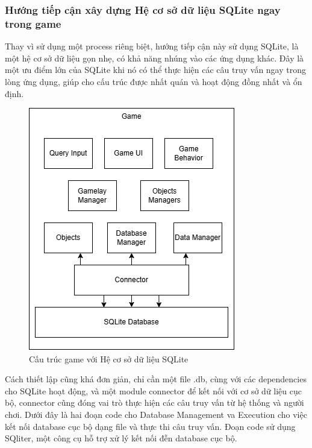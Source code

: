 \subsubsection{Hướng tiếp cận xây dựng Hệ cơ sở dữ liệu SQLite ngay trong game}
\hspace*{1cm} Thay vì sử dụng một process riêng biệt, hướng tiếp cận này sử dụng SQLite, là một hệ cơ sở dữ liệu gọn nhẹ, có khả năng nhúng vào các ứng dụng khác. Đây là một ưu điểm lớn của SQLite khi nó có thể thực hiện các câu truy vấn ngay trong lòng ứng dụng, giúp cho cấu trúc được nhất quán và hoạt động đồng nhất và ổn định.
\begin{figure}[H]
	\centering
	\includegraphics[width=\textwidth]{Images/SQLITE.png}
	\vspace{0.5cm}
	\caption{Cấu trúc game với Hệ cơ sở dữ liệu SQLite}
\end{figure}
\hspace{1cm} Cách thiết lập cũng khá đơn giản, chỉ cần một file .db, cùng với các dependencies cho SQLite hoạt động, và một module connector để kết nối với cơ sở dữ liệu cục bộ, connector cũng đóng vai trò thực hiện các câu truy vấn từ hệ thống và người chơi. Dưới đây là hai đoạn code cho Database Management va Execution cho việc kết nối database cục bộ dạng file và thực thi câu truy vấn. Đoạn code sử dụng SQliter, một công cụ hỗ trợ xử lý kết nối đễn database cục bộ.
